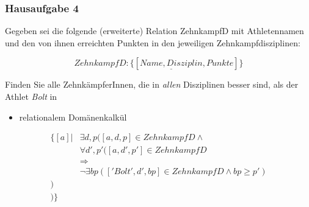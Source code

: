 \begin{frame}[fragile]
	\frametitle{Hausaufgabe 4}
	\vspace{0.25cm}

	\begin{multicols}{2}
		Gegeben sei die folgende (erweiterte) Relation ZehnkampfD mit 
		Athletennamen und den von ihnen erreichten Punkten in den jeweiligen Zehnkampfdisziplinen:

		\[ ZehnkampfD: \{[ \underline{Name, Disziplin}, Punkte ]\} \]

		Finden Sie alle ZehnkämpferInnen, die in \textit{allen} Disziplinen besser sind,
		als der Athlet \textit{Bolt} in
		\begin{itemize}
			\item relationalem Domänenkalkül
		\end{itemize}
		\vfill\columnbreak

		\begin{align*}
			\{ [a] | & \exists d,p ([a, d, p] \in ZehnkampfD \wedge \\
					 & \forall d', p' ([a, d', p'] \in ZehnkampfD \\
					 & \Rightarrow \\
					 & \neg \exists bp (['Bolt', d', bp] \in ZehnkampfD \wedge bp \geq p') \\
					) \\
			)
			 \}
		\end{align*}
	\end{multicols}
\end{frame}

